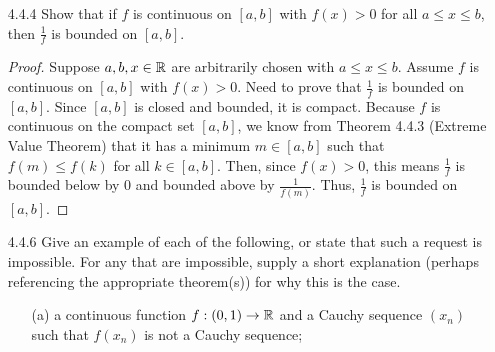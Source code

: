 \documentclass[12pt,letterpaper]{article}
\begin{document}
\begin{itemize}[leftmargin=!,labelindent=5pt]
                Exercise 3.3.1: If $K \subseteq \bbR$ is a compact set, then $\sup K$ and $\inf K$ both exist and are both elements of $K$.
                \begin{proof}
                    Assume $K \subseteq \bbR$ is a compact set.
                    By Theorem 3.3.4 (Heine-Borel Theorem), $K$ is closed and bounded.
                    So, we know from the Axiom of Completeness that $\sup K$ and $\inf K$ exist.
                    Let $s = \sup K$ and $i = \inf K$.
                    Choose any arbitray $\epsilon > 0$.
                    Then, we see that there exists $k \in K$ such that $k \in V_\epsilon(s)$, and since $k \in V_\epsilon(s)$ intersects $K$ in some point other than $s$, we know that $s$ must be a limit point of $K$ by Definition 3.2.4.
                    Similarly, we see that there exists $l \in K$ such that $l \in V_\epsilon(i)$, and since $l \in V_\epsilon(i)$ intersects $K$ in some point other than $i$, we know that $i$ must be a limit point of $K$ by Definition 3.2.4.
                    Since $s$ and $i$ are limit points of $K$ and $K$ is a closed set -- meaning $K = \overline{K}$ -- we know from Definition 3.2.11 that $s,i \in K$.
                \end{proof}
        \item [4.4.4] Show that if $f$ is continuous on $[a,b]$ with $f(x) > 0$ for all $a \leq x \leq b$, then $\frac{1}{f}$ is bounded on $[a,b]$.
                \begin{proof}
                    Suppose $a,b,x \in \mathbb{R}$ are arbitrarily chosen with $a \leq x \leq b$.
                    Assume $f$ is continuous on $[a,b]$ with $f(x) > 0$.
                    Need to prove that $\frac{1}{f}$ is bounded on $[a,b]$.
                    Since $[a,b]$ is closed and bounded, it is compact.
                    Because $f$ is continuous on the compact set $[a,b]$, we know from Theorem 4.4.3 (Extreme Value Theorem) that it has a minimum $m \in [a,b]$ such that $f(m) \leq f(k)$ for all $k \in [a,b]$.
                    Then, since $f(x) > 0$, this means $\frac{1}{f}$ is bounded below by $0$ and bounded above by $\frac{1}{f(m)}$.
                    Thus, $\frac{1}{f}$ is bounded on $[a,b]$.
                \end{proof}
        \newpage
        \item [4.4.6] Give an example of each of the following, or state that such a request is impossible. For any that are impossible, supply a short explanation (perhaps referencing the appropriate theorem(s)) for why this is the case.
            \begin{itemize}
                \item [(a)] a continuous function $f : (0,1) \to \mathbb{R}$ and a Cauchy sequence $(x_n)$ such that $f(x_n)$ is not a Cauchy sequence;
                

\end{itemize}
\end{itemize}
\end{document}
